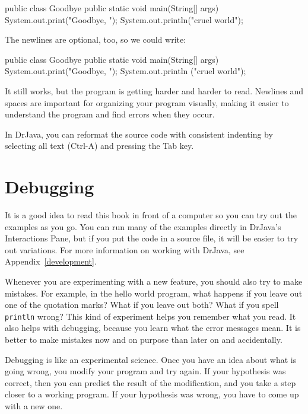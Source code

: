 \documentclass[12pt]{book}
\theoremstyle{exercise}
\newcommand{\java}[1]{\verb"#1"}
\begin{document}
\begin{code}
public class Goodbye {
public static void main(String[] args) {
System.out.print("Goodbye, ");
System.out.println("cruel world");
}
}
\end{code}

The newlines are optional, too, so we could write:

\begin{code}
public class Goodbye { public static void main(String[] args) {
System.out.print("Goodbye, "); System.out.println
("cruel world");}}
\end{code}

It still works, but the program is getting harder and harder to read.
Newlines and spaces are important for organizing your program visually, making it easier to understand the program and find errors when they occur.

In DrJava, you can reformat the source code with consistent indenting by selecting all text ({\sf Ctrl-A}) and pressing the {\sf Tab} key.


\section{Debugging}
\label{sec:examples}

It is a good idea to read this book in front of a computer so you can try out the examples as you go.
You can run many of the examples directly in DrJava's Interactions Pane, but if you put the code in a source file, it will be easier to try out variations.
For more information on working with DrJava, see Appendix~\ref{development}.

Whenever you are experimenting with a new feature, you should also try to make mistakes.
For example, in the hello world program, what happens if you leave out one of the quotation marks?
What if you leave out both?
What if you spell \java{println} wrong?
This kind of experiment helps you remember what you read.
It also helps with debugging, because you learn what the error messages mean.
It is better to make mistakes now and on purpose than later on and accidentally.



Debugging is like an experimental science.
Once you have an idea about what is going wrong, you modify your program and try again.
If your hypothesis was correct, then you can predict the result of the modification, and you take a step closer to a working program.
If your hypothesis was wrong, you have to come up with a new one.
\end{document}
